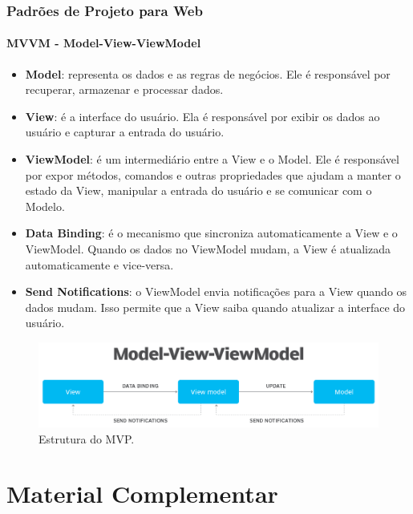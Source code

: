 \documentclass[
	9pt, %
	t, %
]{beamer}
\begin{document}
\begin{frame}
	\frametitle{Padrões de Projeto para Web}
	\framesubtitle{MVVM - Model-View-ViewModel}

	{\small 
	\begin{itemize}
		\item \textbf{Model}: representa os dados e as regras de negócios. Ele é responsável por recuperar, armazenar e processar dados.
		\item \textbf{View}: é a interface do usuário. Ela é responsável por exibir os dados ao usuário e capturar a entrada do usuário.
		\item \textbf{ViewModel}: é um intermediário entre a View e o Model. Ele é responsável por expor métodos, comandos e outras propriedades que ajudam a manter o estado da View, manipular a entrada do usuário e se comunicar com o Modelo.
		\item \textbf{Data Binding}: é o mecanismo que sincroniza automaticamente a View e o ViewModel. Quando os dados no ViewModel mudam, a View é atualizada automaticamente e vice-versa.
		\item \textbf{Send Notifications}: o ViewModel envia notificações para a View quando os dados mudam. Isso permite que a View saiba quando atualizar a interface do usuário.
	\end{itemize}
	}

	\begin{figure}
		\centering
		\includegraphics[width=0.9\linewidth]{Images/mvvm.png}
		\caption{Estrutura do MVP.}\label{fig:mvvm}
	\end{figure}

\end{frame}

\section{Material Complementar}
\end{document}
